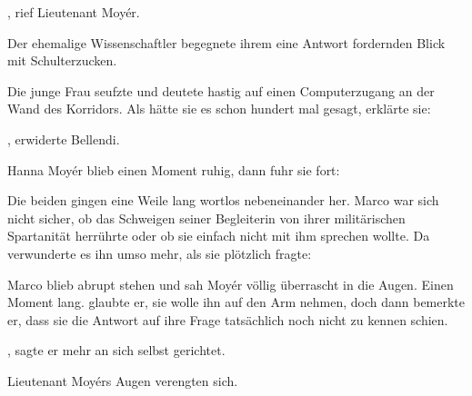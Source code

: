 \par

, rief Lieutenant Moyér. 

\par

Der ehemalige Wissenschaftler begegnete ihrem eine Antwort fordernden Blick mit Schulterzucken. 

\par

Die junge Frau seufzte und deutete hastig auf einen Computerzugang an der Wand des Korridors. Als hätte sie es schon hundert mal gesagt, erklärte sie: 

\par

, erwiderte Bellendi. 

\par

Hanna Moyér blieb einen Moment ruhig, dann fuhr sie fort: 

\par

Die beiden gingen eine Weile lang wortlos nebeneinander her. Marco war sich nicht sicher, ob das Schweigen seiner Begleiterin von ihrer militärischen Spartanität herrührte oder ob sie einfach nicht mit ihm sprechen wollte. Da verwunderte es ihn umso mehr, als sie plötzlich fragte: 

\par

Marco blieb abrupt stehen und sah Moyér völlig überrascht in die Augen. Einen Moment lang. glaubte er, sie wolle ihn auf den Arm nehmen, doch dann bemerkte er, dass sie die Antwort auf ihre Frage tatsächlich noch nicht zu kennen schien.

\par

, sagte er mehr an sich selbst gerichtet. 

\par

Lieutenant Moyérs Augen verengten sich. 

